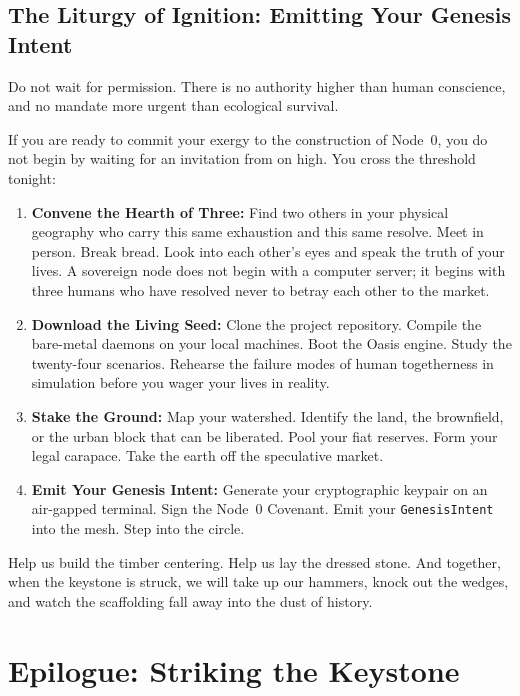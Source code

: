 \subsection{The Liturgy of Ignition: Emitting Your Genesis Intent}
\label{subsec:liturgy_ignition}

Do not wait for permission. There is no authority higher than human conscience, and no mandate more urgent than ecological survival.

If you are ready to commit your exergy to the construction of Node~0, you do not begin by waiting for an invitation from on high. You cross the threshold tonight:

\begin{enumerate}
    \item \textbf{Convene the Hearth of Three:} Find two others in your physical geography who carry this same exhaustion and this same resolve. Meet in person. Break bread. Look into each other's eyes and speak the truth of your lives. A sovereign node does not begin with a computer server; it begins with three humans who have resolved never to betray each other to the market.
    \item \textbf{Download the Living Seed:} Clone the project repository. Compile the bare-metal daemons on your local machines. Boot the Oasis engine. Study the twenty-four scenarios. Rehearse the failure modes of human togetherness in simulation before you wager your lives in reality.
    \item \textbf{Stake the Ground:} Map your watershed. Identify the land, the brownfield, or the urban block that can be liberated. Pool your fiat reserves. Form your legal carapace. Take the earth off the speculative market.
    \item \textbf{Emit Your Genesis Intent:} Generate your cryptographic keypair on an air-gapped terminal. Sign the Node~0 Covenant. Emit your \texttt{GenesisIntent} into the mesh. Step into the circle.
\end{enumerate}

Help us build the timber centering. Help us lay the dressed stone. And together, when the keystone is struck, we will take up our hammers, knock out the wedges, and watch the scaffolding fall away into the dust of history.

\section{Epilogue: Striking the Keystone}
\label{sec:striking_keystone}

